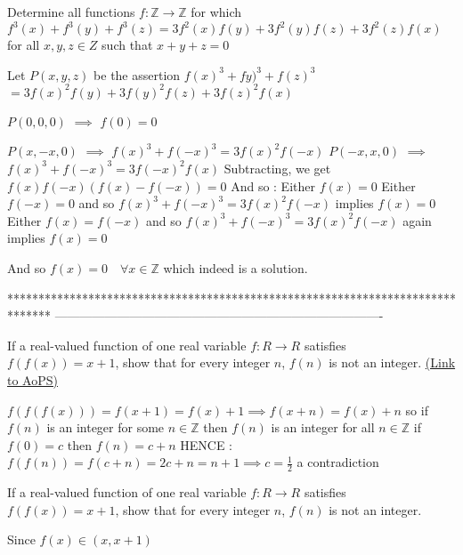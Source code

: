 \begin{solution}
	\begin{tcolorbox}Determine all functions $f: \mathbb{Z}\to\mathbb{Z}$ for which $f^3(x)+f^3(y)+f^3(z)=3f^2(x)f(y)+3f^2(y)f(z)+3f^2(z)f(x)$ for all $x,y,z{\in}Z$ such that $x+y+z=0$\end{tcolorbox}
Let $P(x,y,z)$ be the assertion $f(x)^3+fy)^3+f(z)^3$ $=3f(x)^2f(y)+3f(y)^2f(z)+3f(z)^2f(x)$

$P(0,0,0)$ $\implies$ $f(0)=0$

$P(x,-x,0)$ $\implies$ $f(x)^3+f(-x)^3=3f(x)^2f(-x)$
$P(-x,x,0)$ $\implies$ $f(x)^3+f(-x)^3=3f(-x)^2f(x)$
Subtracting, we get $f(x)f(-x)(f(x)-f(-x))=0$
And so :
Either $f(x)=0$
Either $f(-x)=0$ and so $f(x)^3+f(-x)^3=3f(x)^2f(-x)$ implies $f(x)=0$
Either $f(x)=f(-x)$ and so $f(x)^3+f(-x)^3=3f(x)^2f(-x)$ again implies $f(x)=0$

And so $\boxed{f(x)=0\quad\forall x\in\mathbb Z}$ which indeed is a solution.



\end{solution}
*******************************************************************************
-------------------------------------------------------------------------------

\begin{problem}
	If a real-valued function of one real variable $f: R \to R$ satisfies $f(f(x))=x+1$, show that for every integer $n$, $f(n)$ is not an integer.
	\flushright \href{https://artofproblemsolving.com/community/c6h1589730}{(Link to AoPS)}
\end{problem}



\begin{solution}
	$f(f(f(x)))=f(x+1)=f(x)+1\implies f(x+n)=f(x)+n$
so if $f(n)$ is an integer for some $n\in\mathbb{Z}$ then $f(n)$ is an integer for all $n\in\mathbb{Z}$
if $f(0)=c$ then $f(n)=c+n$ HENCE :
$f(f(n))=f(c+n)=2c+n=n+1\implies c=\frac{1}{2}$
a contradiction
\end{solution}



\begin{solution}
	\begin{tcolorbox}If a real-valued function of one real variable $f: R \to R$ satisfies $f(f(x))=x+1$, show that for every integer $n$, $f(n)$ is not an integer.\end{tcolorbox}

Since $f(x) \in (x,x+1)$
\end{solution}



